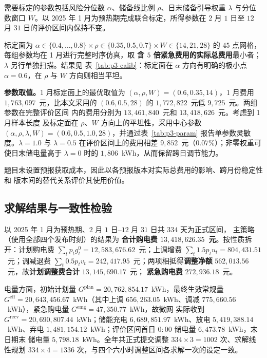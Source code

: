 需要标定的参数包括风险分位数 $\alpha$、储备线比例 $\rho$、日末储备引导权重
$\lambda$ 与分位数窗口 $W$。以 2025 年 1 月为预热期完成联合标定，所得参数在
$2$ 月 $1$ 日至 $12$ 月 $31$ 日的评价区间内保持不变。

标定面为 $\alpha\in\{0.4,\dots,0.8\}\times\rho\in\{0.35,0.5,0.7\}
\times W\in\{14,21,28\}$ 的 $45$ 点网格，每组参数均在 1 月进行完整时序仿真，取
\textbf{含 $5$ 倍紧急费用的实际总费用}最小者；$\lambda$ 另行单独扫描。结果见
表~\ref{tab:p3-calib}：标定面在 $\alpha$ 方向有明确的极小点 $\alpha=0.6$，在
$\rho$ 与 $W$ 方向则相当平坦。

\textbf{参数取值。}1 月标定面上的最优取值为
$(\alpha,\rho,W)=(0.6,0.35,14)$，1 月费用 $1{,}763{,}097$~元，比本文采用的
$(0.6,0.5,28)$ 的 $1{,}772{,}822$~元低 $9{,}725$~元。两组参数在完整评价区间
内的费用分别为 $13{,}461{,}840$~元和 $13{,}418{,}626$~元。考虑到 1 月样本长度
及标定面在 $\rho$、$W$ 方向上的平坦性，采用中心参数
$(\alpha,\rho,\lambda,W)=(0.6,0.5,1.0,28)$，并通过表~\ref{tab:p3-param}
报告单参数灵敏度。$\lambda=1.0$ 与 $\lambda=0.5$ 在评价区间上的费用相差
$9{,}852$~元（$0.07\%$）；非零权重可使日末储电量高于 $\lambda=0$ 时的
$1{,}806$~kWh，从而保留跨日调节能力。

题目未设置预报获取成本，因此以各预报版本对实际总费用的影响、跨月份稳定性和
版本间的替代关系评价其使用价值。



\subsection{求解结果与一致性检验}

以 2025 年 1 月为预热期、$2$ 月 $1$ 日--$12$ 月 $31$ 日共 $334$ 天为正式区间，
主策略（使用全部四个发布时刻）的结果为 \textbf{合计购电费
$13{,}418{,}626.35$~元}。按性质拆开：计划购电费
$\sum_tp_tg_t^0=12{,}583{,}676.62$~元；上调增费
$\sum_t1.5p_tu_t=804{,}431.51$~元；调减退费
$\sum_t0.5p_tv_t=242{,}417.95$~元；两项相抵得\textbf{调整净额}
$562{,}013.56$~元，故\textbf{计划调整费合计} $13{,}145{,}690.17$~元；
\textbf{紧急购电费} $272{,}936.18$~元。

电量方面，初始计划量
$G^{\mathrm{plan}}=20{,}762{,}854.17$~kWh，最终生效常规量
$G^{\mathrm{eff}}=20{,}643{,}456.67$~kWh（其中上调 $656{,}263.05$~kWh、调减
$775{,}660.56$~kWh），紧急购电量 $G^{\mathrm{emg}}=47{,}350.77$~kWh，故微网
实际收到 $G^{\mathrm{recv}}=20{,}690{,}807.44$~kWh；储能充电
$6{,}689{,}851.97$~kWh、放电 $5{,}419{,}388.14$~kWh、弃电
$1{,}481{,}154.12$~kWh；评价区间首日 $0{:}00$ 储电量 $6{,}473.78$~kWh，末日期末
储电量 $5{,}798.18$~kWh。全年共正式提交调整 $334\times3=1002$ 次、求解线性规划
$334\times4=1336$ 次，与四个六小时调整区间各求解一次的设定一致。


